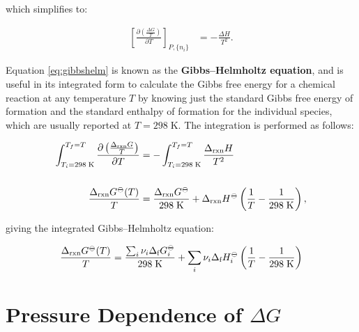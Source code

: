 \documentclass[
  9pt,
]{extbook}
\theoremstyle{definition}
\theoremstyle{definition}
\theoremstyle{definition}
\theoremstyle{remark}
\begin{document}
which simplifies to:

\begin{equation}
\begin{aligned}
\left[ \frac{\partial\left( \frac{\Delta G}{T} \right)}{\partial T} \right]_{P,\{n_i\}} &= - \frac{\Delta H}{T^2}.
\end{aligned}
\label{eq:gibbshelm}
\end{equation}

Equation \eqref{eq:gibbshelm} is known as the \textbf{Gibbs--Helmholtz equation}, and is useful in its integrated form to calculate the Gibbs free energy for a chemical reaction at any temperature \(T\) by knowing just the standard Gibbs free energy of formation and the standard enthalpy of formation for the individual species, which are usually reported at \(T=298\;\text{K}\). The integration is performed as follows:

\begin{equation}
\begin{aligned}
\int_{T_i=298 \;\text{K}}^{T_f=T}  \frac{\partial\left( \frac{\Delta_{\text{rxn}} G}{T} \right)}{\partial T} &=  - \int_{T_i=298 \;\text{K}}^{T_f=T}  \frac{\Delta_{\text{rxn}} H}{T^2} \\ \\ \frac{\Delta_{\text{rxn}} G^{-\kern-6pt{\ominus}\kern-6pt-}(T)}{T} &=  \frac{\Delta_{\text{rxn}} G^{-\kern-6pt{\ominus}\kern-6pt-}}{298 \;\text{K}} + \Delta_{\text{rxn}} H^{-\kern-6pt{\ominus}\kern-6pt-}\left( \frac{1}{T} -\frac{1}{298 \;\text{K}} \right),
\end{aligned}
\label{eq:gibbshelmIbase}
\end{equation}

giving the integrated Gibbs--Helmholtz equation:

\begin{equation}
\frac{\Delta_{\text{rxn}} G^{-\kern-6pt{\ominus}\kern-6pt-}(T)}{T} =  \frac{\sum_i \nu_i \Delta_{\text{f}} G_i^{-\kern-6pt{\ominus}\kern-6pt-}}{298 \;\text{K}} + \sum_i \nu_i \Delta_{\text{f}} H_i^{-\kern-6pt{\ominus}\kern-6pt-}\left( \frac{1}{T} -\frac{1}{298 \;\text{K}} \right)
\label{eq:gibbshelmI}
\end{equation}

\hypertarget{pressure-dependence-of-delta-g}{%
\section{\texorpdfstring{Pressure Dependence of \(\Delta G\)}{Pressure Dependence of \textbackslash Delta G}}\label{pressure-dependence-of-delta-g}}
\end{document}
